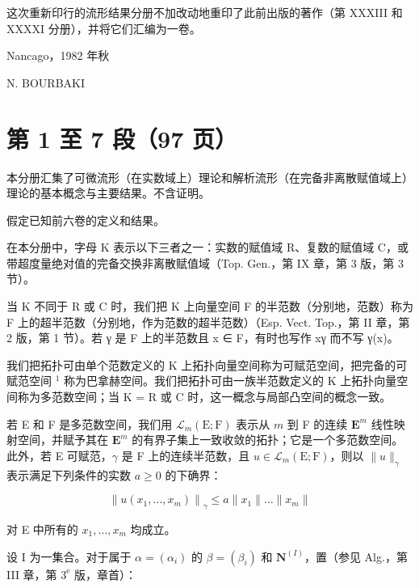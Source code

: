 
这次重新印行的流形结果分册不加改动地重印了此前出版的著作（第 XXXIII 和 XXXXI 分册），并将它们汇编为一卷。

Nancago，1982 年秋

N. BOURBAKI

\part{第 1 至 7 段（97 页）}


本分册汇集了可微流形（在实数域上）理论和解析流形（在完备非离散赋值域上）理论的基本概念与主要结果。不含证明。

假定已知前六卷的定义和结果。



在本分册中，字母 K 表示以下三者之一：实数的赋值域 R、复数的赋值域 C，或带超度量绝对值的完备交换非离散赋值域（Top. Gen.，第 IX 章，第 3 版，第 3 节）。


当 K 不同于 R 或 C 时，我们把 K 上向量空间 F 的半范数（分别地，范数）称为 F 上的超半范数（分别地，作为范数的超半范数）（Esp. Vect. Top.，第 II 章，第 2 版，第 1 节）。若 γ 是 F 上的半范数且 x ∈ F，有时也写作 \textbar\textbar x\textbar\textbar γ 而不写 γ(x)。

我们把拓扑可由单个范数定义的 K 上拓扑向量空间称为可赋范空间，把完备的可赋范空间 \(^{1}\) 称为巴拿赫空间。我们把拓扑可由一族半范数定义的 K 上拓扑向量空间称为多范数空间；当 K = R 或 C 时，这一概念与局部凸空间的概念一致。

若 E 和 F 是多范数空间，我们用 \(\mathcal{L}_{m}(\mathrm{E};\mathrm{F})\) 表示从 \(m\) 到 F 的连续 \(\mathbf{E}^{m}\) 线性映射空间，并赋予其在 \(\mathbf{E}^{m}\) 的有界子集上一致收敛的拓扑；它是一个多范数空间。此外，若 E 可赋范，\(\gamma\) 是 F 上的连续半范数，且 \(u\in\mathcal{L}_{m}(\mathrm{E};\mathrm{F})\)，则以 \(\|u\|_{\gamma}\) 表示满足下列条件的实数 \(a\geqslant0\) 的下确界：

\[
\left\| u (x _ {1}, \dots , x _ {m}) \right\| _ {\gamma} \leqslant a \| x _ {1} \| \dots \| x _ {m} \|
\]

对 E 中所有的 \(x_{1}, \ldots, x_{m}\) 均成立。


设 I 为一集合。对于属于 \(\alpha = (\alpha_{i})\) 的 \(\beta = (\beta_{i})\) 和 \(\mathbf{N}^{(I)}\)，置（参见 Alg.，第 III 章，第 \(3^{\mathrm{e}}\) 版，章首）：

